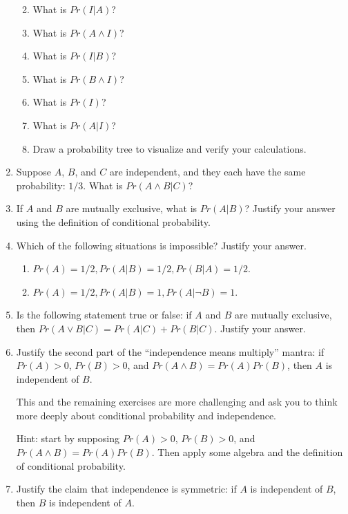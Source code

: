 \documentclass[]{tufte-book}
\providecommand{\tightlist}{%
  \setlength{\itemsep}{0pt}\setlength{\parskip}{0pt}}
\begin{document}
\begin{enumerate}
  \begin{enumerate}
  \def\labelenumii{\alph{enumii}.}
  \tightlist
  \item
    What is \(Pr(I | A)\)?
  \item
    What is \(Pr(A \wedge I)\)?
  \item
    What is \(Pr(I | B)\)?
  \item
    What is \(Pr(B \wedge I)\)?
  \item
    What is \(Pr(I)\)?
  \item
    What is \(Pr(A | I)\)?
  \item
    Draw a probability tree to visualize and verify your calculations.
  \end{enumerate}
\item
  Suppose \(A\), \(B\), and \(C\) are independent, and they each have the same probability: \(1/3\). What is \(Pr(A \wedge B | C)\)?
\item
  If \(A\) and \(B\) are mutually exclusive, what is \(Pr(A | B)\)? Justify your answer using the definition of conditional probability.
\item
  Which of the following situations is impossible? Justify your answer.

  \begin{enumerate}
  \def\labelenumii{\alph{enumii}.}
  \tightlist
  \item
    \(Pr(A) = 1/2, Pr(A | B) = 1/2, Pr(B | A) = 1/2\).
  \item
    \(Pr(A) = 1/2, Pr(A | B) = 1, Pr(A | \neg B) = 1\).
  \end{enumerate}
\item
  Is the following statement true or false: if \(A\) and \(B\) are mutually exclusive, then \(Pr(A \vee B | C) = Pr(A | C) + Pr(B | C)\). Justify your answer.
\item
  Justify the second part of the ``independence means multiply'' mantra: if \(Pr(A) > 0\), \(Pr(B) > 0\), and \(Pr(A \wedge B) = Pr(A) Pr(B)\), then \(A\) is independent of \(B\).

  \begin{marginfigure}
   This and the remaining exercises are more challenging and ask you to
   think more deeply about conditional probability and independence.
   \end{marginfigure}

  Hint: start by supposing \(Pr(A) > 0\), \(Pr(B) > 0\), and \(Pr(A \wedge B) = Pr(A)Pr(B)\). Then apply some algebra and the definition of conditional probability.
\item
  Justify the claim that independence is symmetric: if \(A\) is independent of \(B\), then \(B\) is independent of \(A\).


\end{enumerate}
\end{document}
